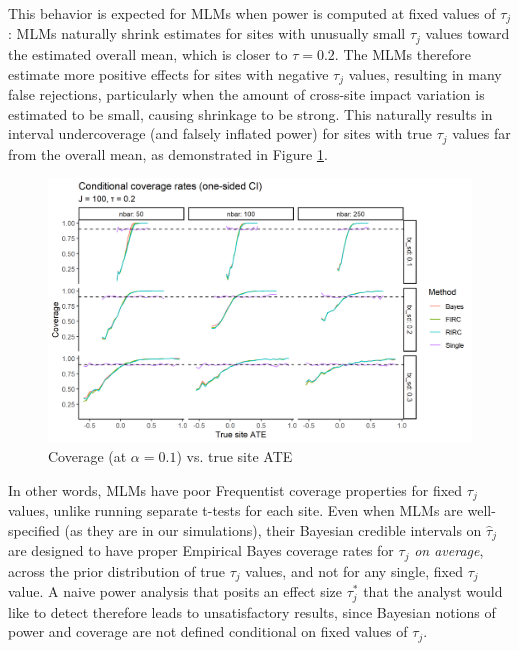 \documentclass[]{article}
\begin{document}
This behavior is expected for MLMs when power is computed at fixed values of $\tau_j$: MLMs naturally shrink estimates for sites with unusually small $\tau_j$ values toward the estimated overall mean, which is closer to $\tau = 0.2$.
The MLMs therefore estimate more positive effects for sites with negative $\tau_j$ values, resulting in many false rejections, particularly when the amount of cross-site impact variation is estimated to be small, causing shrinkage to be strong.
This naturally results in interval undercoverage (and falsely inflated power) for sites with true $\tau_j$ values far from the overall mean, as demonstrated in Figure \ref{fig:coverage_plot}.
\begin{figure}[ht]
	\centering
	\includegraphics[width=\textwidth]{writeup/images/coverage_plot.png}
	\caption{Coverage (at $\alpha = 0.1$) vs. true site ATE}
	\label{fig:coverage_plot}
\end{figure}

In other words, MLMs have poor Frequentist coverage properties for fixed $\tau_j$ values, unlike running separate t-tests for each site.
Even when MLMs are well-specified (as they are in our simulations), their Bayesian credible intervals on $\hat{\tau}_j$ are designed to have proper Empirical Bayes coverage rates for $\tau_j$ \textit{on average}, across the prior distribution of true $\tau_j$ values, and not for any single, fixed $\tau_j$ value.
A naive power analysis that posits an effect size $\tau_j^*$ that the analyst would like to detect therefore leads to unsatisfactory results, since Bayesian notions of power and coverage are not defined conditional on fixed values of $\tau_j$.
\end{document}

